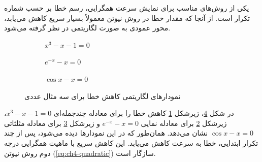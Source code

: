 یکی از روش‌های مناسب برای نمایش سرعت همگرایی، رسم خطا بر حسب شماره تکرار است. از آنجا که مقدار خطا در روش نیوتن معمولاً بسیار سریع کاهش می‌یابد، محور عمودی به صورت لگاریتمی در نظر گرفته می‌شود.

\begin{figure}[H]
\centering

\begin{subfigure}{0.48\textwidth}
\centering
{}
\caption{$x^3-x-1=0$}
\label{fig:sub-ex1}
\end{subfigure}
\hfill
\begin{subfigure}{0.48\textwidth}
\centering
{}
\caption{$e^{-x}-x=0$}
\label{fig:sub-ex2}
\end{subfigure}

\vspace{0.5cm}

\begin{subfigure}{0.6\textwidth}
\centering
{}
\caption{$\cos x-x=0$}
\label{fig:sub-ex3}
\end{subfigure}

\caption{نمودارهای لگاریتمی کاهش خطا برای سه مثال عددی}
\label{fig:error-subplots}
\end{figure}

در شکل \ref{fig:error-subplots}، زیرشکل \ref{fig:sub-ex1} کاهش خطا را برای معادله چندجمله‌ای $x^3-x-1=0$، زیرشکل \ref{fig:sub-ex2} برای معادله نمایی $e^{-x}-x=0$ و زیرشکل \ref{fig:sub-ex3} برای معادله مثلثاتی $\cos x-x=0$ نشان می‌دهد. همان‌طور که در این نمودارها دیده می‌شود، پس از چند تکرار ابتدایی، خطا به سرعت کاهش می‌یابد. این کاهش سریع با ماهیت همگرایی درجه دوم روش نیوتن (\eqref{eq:ch4-quadratic}) سازگار است.

